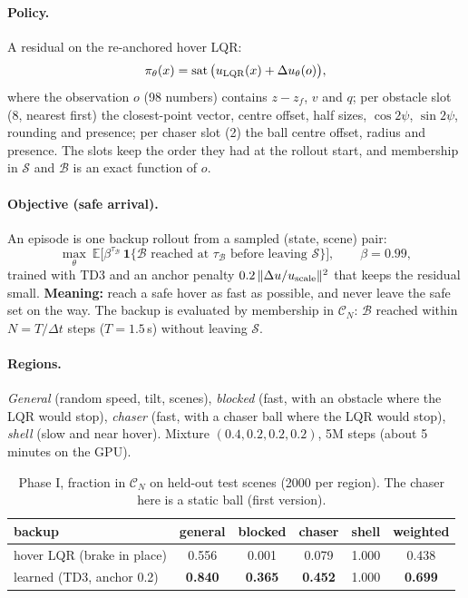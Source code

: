 \documentclass[11pt]{article}
\newcommand{\sat}{\operatorname{sat}}
\newcommand{\Safe}{\mathcal{S}}
\newcommand{\Base}{\mathcal{B}}
\newcommand{\CN}{\mathcal{C}_N}
\begin{document}
\paragraph{Policy.} A residual on the re-anchored hover LQR:
\begin{equation}
\pi_\theta(x)=\sat\big(u_{\rm LQR}(x)+\Delta u_\theta(o)\big),
\end{equation}
where the observation $o$ (98 numbers) contains $z-z_f$, $v$ and $q$; per obstacle slot (8, nearest first) the closest-point vector, centre offset, half sizes, $\cos2\psi$, $\sin2\psi$, rounding and presence; per chaser slot (2) the ball centre offset, radius and presence.
The slots keep the order they had at the rollout start, and membership in $\Safe$ and $\Base$ is an exact function of $o$.

\paragraph{Objective (safe arrival).} An episode is one backup rollout from a sampled (state, scene) pair:
\begin{equation}
\max_\theta\ \mathbb{E}\Big[\beta^{\tau_\Base}\,\mathbf 1\{\text{$\Base$ reached at $\tau_\Base$ before leaving $\Safe$}\}\Big],\qquad \beta=0.99,
\end{equation}
trained with TD3 and an anchor penalty $0.2\,\|\Delta u/u_{\rm scale}\|^2$ that keeps the residual small.
\textbf{Meaning:} reach a safe hover as fast as possible, and never leave the safe set on the way.
The backup is evaluated by membership in $\CN$: $\Base$ reached within $N=T/\Delta t$ steps ($T=1.5$\,s) without leaving $\Safe$.

\paragraph{Regions.} \emph{General} (random speed, tilt, scenes), \emph{blocked} (fast, with an obstacle where the LQR would stop), \emph{chaser} (fast, with a chaser ball where the LQR would stop), \emph{shell} (slow and near hover).
Mixture $(0.4,0.2,0.2,0.2)$, 5M steps (about 5 minutes on the GPU).

\begin{table}[h]\centering\small
\caption{Phase I, fraction in $\CN$ on held-out test scenes (2000 per region). The chaser here is a static ball (first version).}
\begin{tabular}{lccccc}\toprule
backup & general & blocked & chaser & shell & weighted\\\midrule
hover LQR (brake in place) & 0.556 & 0.001 & 0.079 & 1.000 & 0.438\\
learned (TD3, anchor 0.2) & \textbf{0.840} & \textbf{0.365} & \textbf{0.452} & 1.000 & \textbf{0.699}\\\bottomrule
\end{tabular}
\end{table}
\end{document}
